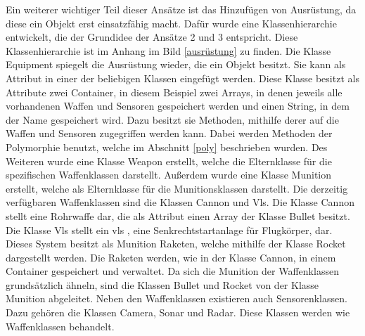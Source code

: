 Ein weiterer wichtiger Teil dieser Ansätze ist das Hinzufügen von Ausrüstung, da diese ein Objekt erst einsatzfähig macht. Dafür wurde eine Klassenhierarchie entwickelt, die der Grundidee der Ansätze 2 und 3 entspricht. Diese Klassenhierarchie ist im Anhang im Bild \ref{ausrüstung} zu finden. Die Klasse \glqq Equipment\grqq{} spiegelt die Ausrüstung wieder, die ein Objekt besitzt. Sie kann als Attribut in einer der beliebigen Klassen eingefügt werden.  Diese Klasse besitzt als Attribute zwei Container, in diesem Beispiel zwei Arrays, in denen jeweils alle vorhandenen Waffen und Sensoren gespeichert werden und einen String, in dem der Name gespeichert wird.  Dazu besitzt sie Methoden, mithilfe derer auf die Waffen und Sensoren zugegriffen werden kann. Dabei werden Methoden der Polymorphie benutzt, welche im Abschnitt  \ref{poly} beschrieben wurden. Des Weiteren wurde eine Klasse \glqq Weapon\grqq{} erstellt, welche die Elternklasse für die spezifischen Waffenklassen darstellt. Außerdem wurde eine Klasse \glqq Munition\grqq{} erstellt, welche als Elternklasse für die Munitionsklassen darstellt. Die derzeitig verfügbaren Waffenklassen sind die Klassen \glqq Cannon\grqq{} und \glqq Vls\grqq{}. Die Klasse \glqq Cannon\grqq{} stellt eine Rohrwaffe dar, die als Attribut einen Array der Klasse  \glqq Bullet\grqq{} besitzt. Die Klasse \glqq Vls\grqq{} stellt ein  \ac{vls} , eine Senkrechtstartanlage für Flugkörper, dar. Dieses System besitzt als Munition Raketen, welche mithilfe der Klasse \glqq Rocket\grqq{} dargestellt werden.  Die Raketen werden, wie in der Klasse \glqq Cannon\grqq{}, in einem Container gespeichert und verwaltet. Da sich die Munition der Waffenklassen grundsätzlich ähneln, sind die Klassen \glqq Bullet\grqq{} und  \glqq Rocket\grqq{}  von der Klasse  \glqq Munition\grqq{} abgeleitet. Neben den Waffenklassen existieren auch Sensorenklassen. Dazu gehören die Klassen \glqq Camera\grqq{}, \glqq Sonar\grqq{} und \glqq Radar\grqq{}. Diese Klassen werden wie Waffenklassen behandelt. 
 
